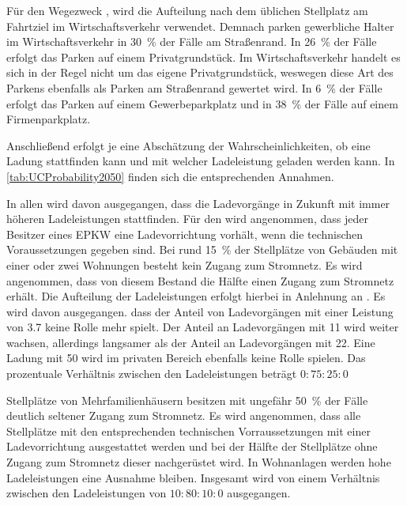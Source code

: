 Für den Wegezweck \dienstdot, wird die Aufteilung nach dem üblichen Stellplatz am Fahrtziel im Wirtschaftsverkehr verwendet. \cite{Rikus2015}
Demnach parken gewerbliche Halter im Wirtschaftsverkehr in \SI{30}{\percent} der Fälle am Straßenrand.
In \SI{26}{\percent} der Fälle erfolgt das Parken auf einem Privatgrundstück.
Im Wirtschaftsverkehr handelt es sich in der Regel nicht um das eigene Privatgrundstück, weswegen diese Art des Parkens ebenfalls als Parken am Straßenrand gewertet wird.
In \SI{6}{\percent} der Fälle erfolgt das Parken auf einem Gewerbeparkplatz und in \SI{38}{\percent} der Fälle auf einem Firmenparkplatz.\medskip

Anschließend erfolgt je \UC eine Abschätzung der Wahrscheinlichkeiten, ob eine Ladung stattfinden kann und mit welcher Ladeleistung geladen werden kann.
In \autoref{tab:UCProbability2050} finden sich die entsprechenden Annahmen.



In allen \UCs wird davon ausgegangen, dass die Ladevorgänge in Zukunft mit immer höheren Ladeleistungen stattfinden.
Für den \UC \Eigenheim wird angenommen, dass jeder Besitzer eines \gls{EPKW} eine Ladevorrichtung vorhält, wenn die technischen Voraussetzungen gegeben sind.
Bei rund \SI{15}{\percent} der Stellplätze von Gebäuden mit einer oder zwei Wohnungen besteht kein Zugang zum Stromnetz. \cite{dena2020}
Es wird angenommen, dass von diesem Bestand die Hälfte einen Zugang zum Stromnetz erhält.
Die Aufteilung der Ladeleistungen erfolgt hierbei in Anlehnung an \cite{NPZMAVE2020}.
Es wird davon ausgegangen. dass der Anteil von Ladevorgängen mit einer Leistung von \SI{3.7}{\kw} keine Rolle mehr spielt.
Der Anteil an Ladevorgängen mit \SI{11}{\kw} wird weiter wachsen, allerdings langsamer als der Anteil an Ladevorgängen mit \SI{22}{\kw}.
Eine Ladung mit \SI{50}{\kw} wird im privaten Bereich ebenfalls keine Rolle spielen.
Das prozentuale Verhältnis zwischen den Ladeleistungen beträgt \(0:75:25:0\)\medskip

Stellplätze von Mehrfamilienhäusern besitzen mit ungefähr \SI{50}{\percent} der Fälle deutlich seltener Zugang zum Stromnetz. \cite{dena2020}
Es wird angenommen, dass alle Stellplätze mit den entsprechenden technischen Vorraussetzungen mit einer Ladevorrichtung ausgestattet werden und bei der Hälfte der Stellplätze ohne Zugang zum Stromnetz dieser nachgerüstet wird.
In Wohnanlagen werden hohe Ladeleistungen eine Ausnahme bleiben.
Insgesamt wird von einem Verhältnis zwischen den Ladeleistungen von \(10:80:10:0\) ausgegangen.\medskip

